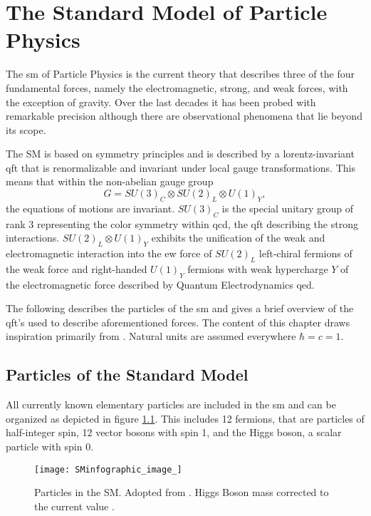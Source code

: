 \chapter{The Standard Model of Particle Physics}
\noindent The \ac{sm} of Particle Physics is the current theory that describes three of the four fundamental forces, namely the electromagnetic, strong, and weak forces, with the exception of gravity. Over the last decades it has been probed with remarkable precision although there are  observational phenomena that lie beyond its scope.

The SM is based on symmetry principles and is described by a lorentz-invariant \ac{qft} that is renormalizable and invariant under local gauge transformations. This means that within the non-abelian gauge group
\begin{equation}
    G = SU(3)_C \otimes SU(2)_L \otimes U(1)_Y,
\end{equation}
the equations of motions are invariant. $SU(3)_C$ is the special unitary group of rank 3 representing the color symmetry within \ac{qcd}, the \ac{qft} describing the strong interactions. $SU(2)_L \otimes U(1)_Y$ exhibits the unification of the weak and electromagnetic interaction into the \ac{ew} force of $SU(2)_L$ left-chiral fermions of the weak force and right-handed $U(1)_Y$ fermions with weak hypercharge $Y$ of the electromagnetic force described by Quantum Electrodynamics \ac{qed}.

The following describes the particles of the \ac{sm} and gives a brief overview of the \ac{qft}'s used to describe aforementioned forces. The content of this chapter draws inspiration primarily from \citep{hollik2010quantum,griffiths2020introduction,thomson2013modern,zee2010quantum,halzen1984introductory}. Natural units are assumed everywhere $\hbar=c=1$.


\section{Particles of the Standard Model}

All currently known elementary particles are included in the \ac{sm} and can be organized as depicted in figure \ref{fig:sm}. This includes 12 fermions, that are particles of half-integer spin, 12 vector bosons with spin 1, and the Higgs boson, a scalar particle with spin 0.


\begin{figure}
    \centering
    \texttt{[image: SMinfographic\_image\_]}
    \caption[]{Particles in the SM. Adopted from \citep{smpar}. Higgs Boson mass corrected to the current value \citep{particle2022review}. }
    \label{fig:sm}
\end{figure}


